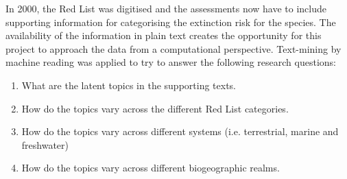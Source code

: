 In 2000, the Red List was digitised \parencite{iucn2021} and the assessments now have to include supporting information for categorising the extinction risk for the species.
The availability of the information in plain text creates the opportunity for this project to approach the data from a computational perspective. Text-mining by machine reading was applied to try to answer the following research questions:
\begin{enumerate}
    \item What are the latent topics in the supporting texts.
    \item How do the topics vary across the different Red List categories.
    \item How do the topics vary across different systems (i.e. terrestrial, marine and freshwater)
    \item How do the topics vary across different biogeographic realms.
\end{enumerate}
